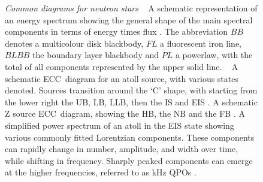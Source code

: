 \begin{landscape}
\begin{figure}[H]
{\begin{minipage}[c]{0.48\textwidth}
\label{fig:ns_ps}
  \end{minipage}}
\caption[Common diagrams for neutron stars]{%
\emph{Common diagrams for neutron stars} ~ A schematic representation of an energy spectrum showing the general shape of the main spectral components in terms of energy times flux \citep[see][]{lin2007evaluating}. The abbreviation $BB$ denotes a multicolour disk blackbody, $FL$ a fluorescent iron line, $BLBB$ the boundary layer blackbody and $PL$ a powerlaw, with the total of all components represented by the upper solid line.
~  A schematic \ac{ECC}~diagram for an atoll source, with various states denoted. Sources transition around the `C' shape, with starting from the lower right the \acf{UB}, \acf{LB}, \acf{LLB}, then the \acf{IS} and \acf{EIS} \citep{kleinwolt}.
 A schematic Z source \ac{ECC}~diagram, showing the \acf{HB}, the \acf{NB} and the \acf{FB} \citep{kleinwolt}.
 A simplified power spectrum of an atoll in the \ac{EIS} state showing various commonly fitted Lorentzian components. These components can rapidly change in number, amplitude, and width over time, while shifting in frequency. Sharply peaked components can emerge at the higher frequencies, referred to as kHz \acfp{QPO} \citep[see][]{kleinwolt,marieke}. 
	}\label{fig:ns_graphs}
\end{figure}
\end{landscape}